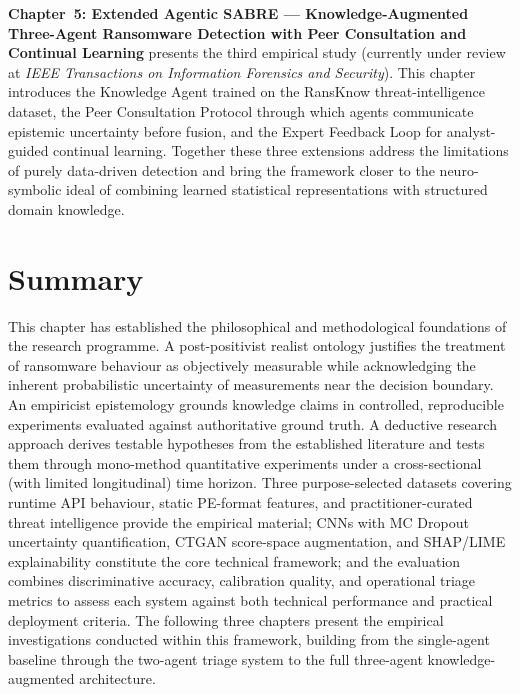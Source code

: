 \textbf{Chapter~5: Extended Agentic SABRE --- Knowledge-Augmented Three-Agent Ransomware
Detection with Peer Consultation and Continual Learning} presents the third empirical study
(currently under review at \emph{IEEE Transactions on Information Forensics and Security}).
This chapter introduces the Knowledge Agent trained on the RansKnow threat-intelligence
dataset, the Peer Consultation Protocol through which agents communicate epistemic uncertainty
before fusion, and the Expert Feedback Loop for analyst-guided continual learning.
Together these three extensions address the limitations of purely data-driven detection and
bring the framework closer to the neuro-symbolic ideal of combining learned statistical
representations with structured domain knowledge.

\section{Summary}
\label{sec:resdesign_summary}

This chapter has established the philosophical and methodological foundations of the research
programme.
A post-positivist realist ontology justifies the treatment of ransomware behaviour as
objectively measurable while acknowledging the inherent probabilistic uncertainty of
measurements near the decision boundary.
An empiricist epistemology grounds knowledge claims in controlled, reproducible experiments
evaluated against authoritative ground truth.
A deductive research approach derives testable hypotheses from the established literature and
tests them through mono-method quantitative experiments under a cross-sectional (with
limited longitudinal) time horizon.
Three purpose-selected datasets covering runtime API behaviour, static PE-format features,
and practitioner-curated threat intelligence provide the empirical material; CNNs with MC
Dropout uncertainty quantification, CTGAN score-space augmentation, and SHAP/LIME
explainability constitute the core technical framework; and the evaluation combines
discriminative accuracy, calibration quality, and operational triage metrics to assess each
system against both technical performance and practical deployment criteria.
The following three chapters present the empirical investigations conducted within this
framework, building from the single-agent baseline through the two-agent triage system
to the full three-agent knowledge-augmented architecture.
